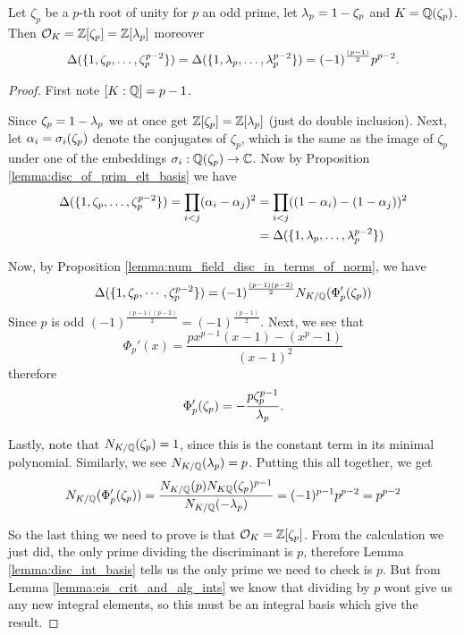 \begin{theorem}\label{theorem:ring_of_ints_of_cyclo}
	\leanok 
	Let $\zeta_p$ be a $p$-th root of unity for $p$ an odd prime, let $\lambda_p=1-\zeta_p$ and $K=\mathbb{Q}(\zeta_p)$. Then $\mathcal{O}_K=\mathbb{Z}[\zeta_p]=\mathbb{Z}[\lambda_p]$ moreover \[\Delta(\{1,\zeta_p,\dots,\zeta_p^{p-2}\})=\Delta(\{1,\lambda_p,\dots,\lambda_p^{p-2}\})=(-1)^{\frac{(p-1)}{2}}p^{p-2}.\]
\end{theorem}

\begin{proof}
	First note $[K:\mathbb{Q}]=p-1$.

	Since $\zeta_p=1-\lambda_p$ we at once get $\mathbb{Z}[\zeta_p]=\mathbb{Z}[\lambda_p]$ (just do double inclusion). Next, let $\alpha_i=\sigma_i(\zeta_p)$ denote the conjugates of $\zeta_p$, which is the same as the image of $\zeta_p$ under one of the embeddings $\sigma_i: \mathbb{Q}(\zeta_p) \to \mathbb{C}$. Now  by Proposition \ref{lemma:disc_of_prim_elt_basis} we have \begin{align*}\Delta(\{1,\zeta_p,\dots,\zeta_p^{p-2}\})=\prod_{i < j}  (\alpha_i-\alpha_j)^2 &=\prod_{i < j}  ((1-\alpha_i)-(1-\alpha_j))^2\\&=\Delta(\{1,\lambda_p,\dots,\lambda_p^{p-2}\})\end{align*}

	Now, by Proposition \ref{lemma:num_field_disc_in_terms_of_norm}, we have \[\Delta(\{1,\zeta_p,\cdots,\zeta_p^{p-2}\})=(-1)^{\frac{(p-1)(p-2)}{2}}N_{K/\mathbb{Q}}(\Phi_p'(\zeta_p)  )\]
	Since $p$ is odd $(-1)^{\frac{(p-1)(p-2)}{2}}=(-1)^{\frac{(p-1)}{2}}$. Next, we see that \[\Phi_p'(x)=\frac{px^{p-1}(x-1)-(x^p-1)}{(x-1)^2}\] therefore \[\Phi_p'(\zeta_p)=-\frac{p\zeta_p^{p-1}}{\lambda_p}.\]

	Lastly, note that $N_{K/\mathbb{Q}}(\zeta_p)=1$, since this is the constant term in its minimal polynomial. Similarly, we see $N_{K/\mathbb{Q}}(\lambda_p)=p$. Putting this all together, we get \[N_{K/\mathbb{Q}}(\Phi_p'(\zeta_p)  )=\frac{N_{K/\mathbb{Q}}(p)N_{K\mathbb{Q}}(\zeta_p)^{p-1}}{N_{K/\mathbb{Q}}(-\lambda_p)}=(-1)^{p-1}p^{p-2}=p^{p-2}\]

	So the last thing we need to prove is that $\mathcal{O}_K=\mathbb{Z}[\zeta_p]$. From the calculation we just did, the only prime dividing the discriminant is $p$, therefore Lemma \ref{lemma:disc_int_basis} tells us the only prime we need to check is $p$. But from Lemma \ref{lemma:eis_crit_and_alg_ints} we know that dividing by $p$ wont give us any new integral elements, so this must be an integral basis which give the result.
\end{proof}

